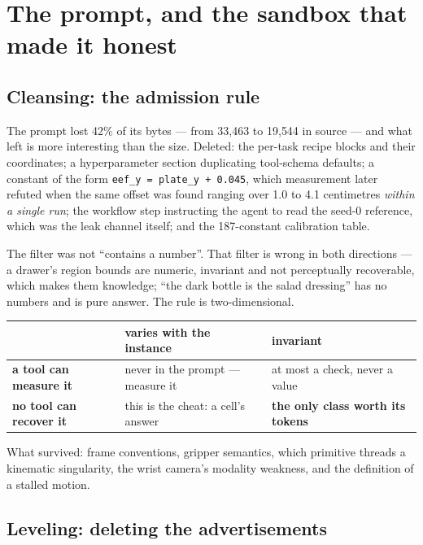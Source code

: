 \documentclass[11pt,a4paper]{report}
\begin{document}
\chapter{The prompt, and the sandbox that made it honest}
\label{ch:sandbox}

\section{Cleansing: the admission rule}

The prompt lost 42\% of its bytes --- from 33{,}463 to 19{,}544 in source ---
and what left is more interesting than the size. Deleted: the per-task recipe
blocks and their coordinates; a hyperparameter section duplicating tool-schema
defaults; a constant of the form \texttt{eef\_y = plate\_y + 0.045}, which
measurement later refuted when the same offset was found ranging over 1.0 to 4.1
centimetres \emph{within a single run}; the workflow step instructing the agent
to read the seed-0 reference, which was the leak channel itself; and the
187-constant calibration table.

The filter was not ``contains a number''. That filter is wrong in both
directions --- a drawer's region bounds are numeric, invariant and not
perceptually recoverable, which makes them knowledge; ``the dark bottle is the
salad dressing'' has no numbers and is pure answer. The rule is two-dimensional.

\begin{table}[htbp]
\centering\small
\begin{tabularx}{0.92\textwidth}{@{}l X X@{}}
\toprule
 & \textbf{varies with the instance} & \textbf{invariant} \\
\midrule
\textbf{a tool can measure it} & never in the prompt --- measure it & at most a check, never a value \\
\textbf{no tool can recover it} & this is the cheat: a cell's answer & \textbf{the only class worth its tokens} \\
\bottomrule
\end{tabularx}
\end{table}

\noindent
What survived: frame conventions, gripper semantics, which primitive threads a
kinematic singularity, the wrist camera's modality weakness, and the definition
of a stalled motion.

\section{Leveling: deleting the advertisements}
\end{document}
